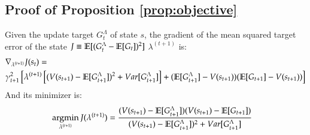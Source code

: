 \subsection{Proof of Proposition \ref{prop:objective}}
\begin{proposition*}
Given the update target $G_t^\Lambda$ of state $s$, the gradient of the mean squared target error of the state $J \equiv \mathbb{E}[(G_t^\Lambda - \mathbb{E}[G_t])^2]$ \wrt{} $\lambda^{(t+1)}$ is:
\begin{equation}
    \begin{aligned}
    & \nabla_{\lambda^{(t+1)}} J(s_t) = \\
    &\gamma_{t+1}^2 \left[\lambda^{(t+1)} \left[ (V(s_{t+1}) - \mathbb{E}[G_{t+1}^\Lambda])^2 + Var[G_{t+1}^\Lambda] \right] + (\mathbb{E}[G_{t+1}^\Lambda] - V(s_{t+1}))
    (\mathbb{E}[G_{t+1}] - V(s_{t+1}))\right]
    \end{aligned}\nonumber
\end{equation}
And its minimizer is:
\begin{equation}
\begin{aligned}
& \operatorname*{argmin}_{\lambda^{(t+1)}}{J(\lambda^{(t+1)})} = \frac{
(V(s_{t+1}) - \mathbb{E}[G_{t+1}^\Lambda])
    (V(s_{t+1}) - \mathbb{E}[G_{t+1}])
}
{(V(s_{t+1}) - \mathbb{E}[G_{t+1}^\Lambda])^2 + Var[G_{t+1}^\Lambda]}
\end{aligned}\nonumber
\end{equation}
\end{proposition*}

